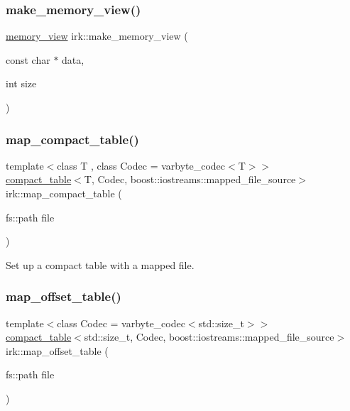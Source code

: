 \mbox{\label{namespaceirk_ab21cb1ed22fd54ee08ae5d4e93485857}} 
\subsubsection{\texorpdfstring{make\+\_\+memory\+\_\+view()}{make\_memory\_view()}\hspace{0.1cm}{\footnotesize\ttfamily [2/2]}}
{\footnotesize\ttfamily \mbox{\hyperlink{classirk_1_1memory__view}{memory\+\_\+view}} irk\+::make\+\_\+memory\+\_\+view (\begin{DoxyParamCaption}\item[{const char $\ast$}]{data,  }\item[{int}]{size }\end{DoxyParamCaption})}

\mbox{\label{namespaceirk_a72297d13b3e41cd8dafdcc28ff3c4528}} 
\subsubsection{\texorpdfstring{map\+\_\+compact\+\_\+table()}{map\_compact\_table()}}
{\footnotesize\ttfamily template$<$class T , class Codec  = varbyte\+\_\+codec$<$\+T$>$$>$ \\
\mbox{\hyperlink{classirk_1_1compact__table}{compact\+\_\+table}}$<$T, Codec, boost\+::iostreams\+::mapped\+\_\+file\+\_\+source$>$ irk\+::map\+\_\+compact\+\_\+table (\begin{DoxyParamCaption}\item[{fs\+::path}]{file }\end{DoxyParamCaption})}



Set up a compact table with a mapped file. 

\mbox{\label{namespaceirk_a647b6c35c655d88bb5fb522a4d77ef49}} 
\subsubsection{\texorpdfstring{map\+\_\+offset\+\_\+table()}{map\_offset\_table()}}
{\footnotesize\ttfamily template$<$class Codec  = varbyte\+\_\+codec$<$std\+::size\+\_\+t$>$$>$ \\
\mbox{\hyperlink{classirk_1_1compact__table}{compact\+\_\+table}}$<$std\+::size\+\_\+t, Codec, boost\+::iostreams\+::mapped\+\_\+file\+\_\+source$>$ irk\+::map\+\_\+offset\+\_\+table (\begin{DoxyParamCaption}\item[{fs\+::path}]{file }\end{DoxyParamCaption})}



